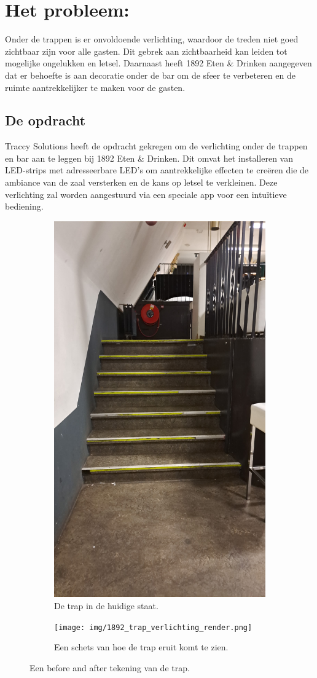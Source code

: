 \section{Het probleem:}
Onder de trappen is er onvoldoende verlichting, waardoor de treden niet goed zichtbaar zijn voor alle gasten. Dit gebrek aan zichtbaarheid kan leiden tot mogelijke ongelukken en letsel. Daarnaast heeft 1892 Eten \& Drinken aangegeven dat er behoefte is aan decoratie onder de bar om de sfeer te verbeteren en de ruimte aantrekkelijker te maken voor de gasten.

\subsection{De opdracht}
Traccy Solutions heeft de opdracht gekregen om de verlichting onder de trappen en bar aan te leggen bij 1892 Eten \& Drinken. Dit omvat het installeren van LED-strips met adresseerbare LED's om aantrekkelijke effecten te creëren die de ambiance van de zaal versterken en de kans op letsel te verkleinen. Deze verlichting zal worden aangestuurd via een speciale app voor een intuïtieve bediening.

\begin{figure}[!h]
\centering
\begin{subfigure}{.5\textwidth}
  \centering
  \includegraphics[width=.5\linewidth]{img/1892_trap.jpg}
  \caption{De trap in de huidige staat.}
  \label{fig:sub1}
\end{subfigure}%
\begin{subfigure}{.5\textwidth}
  \centering
  \texttt{[image: img/1892\_trap\_verlichting\_render.png]}
  \caption{Een schets van hoe de trap eruit komt te zien.}
  \label{fig:sub2}
\end{subfigure}
\caption{Een before and after tekening van de trap.}
\label{fig:test}
\end{figure}